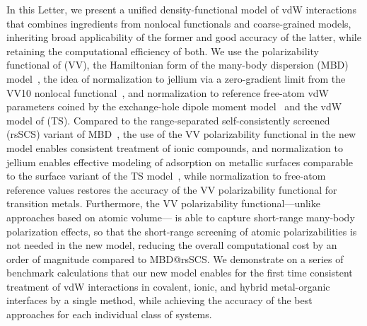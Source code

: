 In this Letter, we present a unified density-functional model of vdW interactions that combines ingredients from nonlocal functionals and coarse-grained models, inheriting broad applicability of the former and good accuracy of the latter, while retaining the computational efficiency of both.
We use the polarizability functional of \citet{VydrovPRA10} (VV), the Hamiltonian form of the many-body dispersion (MBD) model~\citep{TkatchenkoJCP13}, the idea of normalization to jellium via a zero-gradient limit from the VV10 nonlocal functional~\citep{VydrovJCP10a}, and normalization to reference free-atom vdW parameters coined by the exchange-hole dipole moment model~\citep{BeckeJCP06} and the vdW model of \citet{TkatchenkoPRL09} (TS).
Compared to the range-separated self-consistently screened (rsSCS) variant of MBD~\citep{AmbrosettiJCP14}, the use of the VV polarizability functional in the new model enables consistent treatment of ionic compounds, and normalization to jellium enables effective modeling of adsorption on metallic surfaces comparable to the surface variant of the TS model~\cite{RuizPRL12}, while normalization to free-atom reference values restores the accuracy of the VV polarizability functional for transition metals.
Furthermore, the VV polarizability functional---unlike approaches based on atomic volume---
is able to capture short-range many-body polarization effects, so that the short-range screening of atomic polarizabilities is not needed in the new model, reducing the overall computational cost by an order of magnitude compared to MBD@rsSCS\@.
We demonstrate on a series of benchmark calculations that our new model enables for the first time consistent treatment of vdW interactions in covalent, ionic, and hybrid metal-organic interfaces by a single method, while achieving the accuracy of the best approaches for each individual class of systems.

